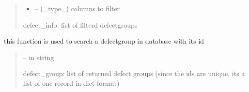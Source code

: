 \documentclass[letterpaper,10pt,english]{sphinxmanual}
\begin{document}
\begin{savenotes}
\begin{fulllineitems}
\begin{savenotes}
\begin{fulllineitems}
\begin{quote}
\begin{description}
\begin{itemize}
\item {} 
\sphinxAtStartPar
{} – (\_type\_) columns to filter

\end{itemize}

\sphinxAtStartPar
defect\_info: list of filterd defect\sphinxhyphen{}groups

\end{description}\end{quote}

\end{fulllineitems}\end{savenotes}


\begin{savenotes}\begin{fulllineitems}
\label{\detokenize{setting/database_utils:oxin.database_utils.dataBaseUtils.search_defect_group_by_id}}
\pysigstartsignatures
{}
\pysigstopsignatures
\sphinxAtStartPar
this function is used to search a defect\sphinxhyphen{}group in database with its id
\begin{quote}\begin{description}
\sphinxAtStartPar
{} – in string

\sphinxAtStartPar
defect\_group: list of returned defect groups (since the ids are unique, its a list of one record in dict format)

\end{description}\end{quote}

\end{fulllineitems}\end{savenotes}



\end{fulllineitems}
\end{savenotes}
\end{document}
